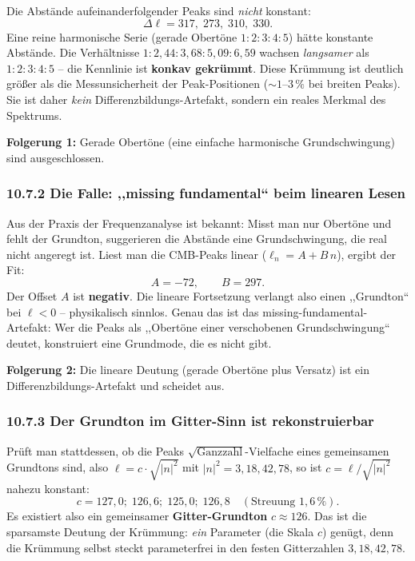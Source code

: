 Die Abstände aufeinanderfolgender Peaks sind \emph{nicht} konstant:
\[
  \Delta\ell = 317,\; 273,\; 310,\; 330.
\]
Eine reine harmonische Serie (gerade Obertöne $1:2:3:4:5$) hätte
konstante Abstände. Die Verhältnisse $1:2{,}44:3{,}68:5{,}09:6{,}59$
wachsen \emph{langsamer} als $1:2:3:4:5$ -- die Kennlinie ist
\textbf{konkav gekrümmt}. Diese Krümmung ist deutlich größer als die
Messunsicherheit der Peak-Positionen ($\sim 1$--$3\,\%$ bei breiten
Peaks). Sie ist daher \emph{kein} Differenzbildungs-Artefakt, sondern
ein reales Merkmal des Spektrums.

\textbf{Folgerung 1:} Gerade Obertöne (eine einfache harmonische
Grundschwingung) sind ausgeschlossen.

\subsubsection*{10.7.2 Die Falle: ,,missing fundamental`` beim linearen Lesen}

Aus der Praxis der Frequenzanalyse ist bekannt: Misst man nur Obertöne
und fehlt der Grundton, suggerieren die Abstände eine Grundschwingung,
die real nicht angeregt ist. Liest man die CMB-Peaks linear
($\ell_n = A + B\,n$), ergibt der Fit:
\[
  A = -72, \qquad B = 297.
\]
Der Offset $A$ ist \textbf{negativ}. Die lineare Fortsetzung verlangt
also einen ,,Grundton`` bei $\ell < 0$ -- physikalisch sinnlos. Genau das
ist das missing-fundamental-Artefakt: Wer die Peaks als ,,Obertöne einer
verschobenen Grundschwingung`` deutet, konstruiert eine Grundmode, die
es nicht gibt.

\textbf{Folgerung 2:} Die lineare Deutung (gerade Obertöne plus Versatz)
ist ein Differenzbildungs-Artefakt und scheidet aus.

\subsubsection*{10.7.3 Der Grundton im Gitter-Sinn ist rekonstruierbar}

Prüft man stattdessen, ob die Peaks $\sqrt{\text{Ganzzahl}}$-Vielfache
eines gemeinsamen Grundtons sind, also $\ell = c\cdot\sqrt{|n|^2}$ mit
$|n|^2 = 3, 18, 42, 78$, so ist $c = \ell/\sqrt{|n|^2}$ nahezu konstant:
\[
  c = 127{,}0;\; 126{,}6;\; 125{,}0;\; 126{,}8
  \quad(\text{Streuung } 1{,}6\,\%).
\]
Es existiert also ein gemeinsamer \textbf{Gitter-Grundton}
$c \approx 126$. Das ist die sparsamste Deutung der Krümmung:
\emph{ein} Parameter (die Skala $c$) genügt, denn die Krümmung selbst
steckt parameterfrei in den festen Gitterzahlen $3, 18, 42, 78$.

